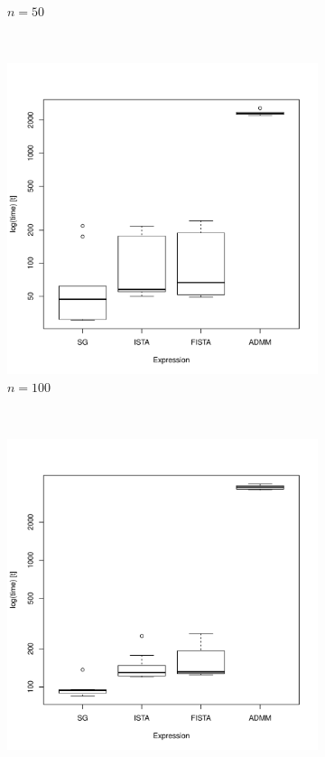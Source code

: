 \documentclass[12pt, leqno]{article}
\theoremstyle{remark}
\begin{document}
\begin{figure}[H]
\begin{subfigure}[b]{0.4\textwidth}
        \caption{$n=50$}
        \label{fig:50}
    \end{subfigure}
\\
    \begin{subfigure}[b]{0.4\textwidth}
        \includegraphics[width=\textwidth]{100timing.pdf}
        \caption{$n=100$}
        \label{fig:100}
    \end{subfigure}
~
    \begin{subfigure}[b]{0.4\textwidth}
        \includegraphics[width=\textwidth]{500timing.pdf}

\end{subfigure}
\end{figure}
\end{document}
